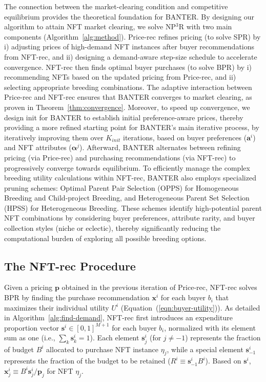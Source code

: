\documentclass[conference]{IEEEtran}
\theoremstyle{plain}
\begin{document}
    The connection between the market-clearing condition and competitive equilibrium provides the theoretical foundation for BANTER. By designing our algorithm to attain NFT market clearing, we solve NP$^3$R with two main components (Algorithm~\ref{alg:method}). Price-rec refines pricing (to solve SPR) by i) adjusting prices of high-demand NFT instances after buyer recommendations from NFT-rec, and ii) designing a demand-aware step-size schedule to accelerate convergence. NFT-rec then finds optimal buyer purchases (to solve BPR) by i) recommending NFTs based on the updated pricing from Price-rec, and ii) selecting appropriate breeding combinations. The adaptive interaction between Price-rec and NFT-rec ensures that BANTER converges to market clearing, as proven in Theorem~\ref{thm:convergence}. Moreover, to speed up convergence, we design init for BANTER to establish initial preference-aware prices, thereby providing a more refined starting point for BANTER's main iterative process, by iteratively improving them over $K_{init}$ iterations, based on buyer preferences ($\mathbf{a}^i$) and NFT attributes ($\bm{\alpha}^j$). Afterward, BANTER alternates between refining pricing (via Price-rec) and purchasing recommendations (via NFT-rec) to progressively converge towards equilibrium. To efficiently manage the complex breeding utility calculations within NFT-rec, BANTER also employs specialized pruning schemes: Optimal Parent Pair Selection (OPPS) for Homogeneous Breeding and Child-project Breeding, and Heterogeneous Parent Set Selection (HPSS) for Heterogeneous Breeding. These schemes identify high-potential parent NFT combinations by considering buyer preferences, attribute rarity, and buyer collection styles (niche or eclectic), thereby significantly reducing the computational burden of exploring all possible breeding options.

\subsection{The NFT-rec Procedure}
\label{subsec:method-user-demand}
    Given a pricing $\mathbf{p}$ obtained in the previous iteration of Price-rec, NFT-rec solves BPR by finding the purchase recommendation $\mathbf{x}^i$ for each buyer $b_i$ that maximizes their individual utility $U^i$ (Equation~(\ref{eqn:buyer-utility})). As detailed in Algorithm~\ref{alg:find-demand}, NFT-rec first introduces an expenditure proportion vector $\mathbf{s}^i\in [0,1]^{M+1}$ for each buyer $b_i$, normalized with its element sum as one (i.e., $\sum_k \mathbf{s}^i_k = 1$). Each element $\mathbf{s}^i_j$ (for $j \neq -1$) represents the fraction of budget $B^i$ allocated to purchase NFT instance $\eta_j$, while a special element $\mathbf{s}^i_{-1}$ represents the fraction of the budget to be retained ($R^i \equiv \mathbf{s}^i_{-1}B^i$). Based on $\mathbf{s}^i$,$\mathbf{x}^i_j \equiv B^i\mathbf{s}^i_j/\mathbf{p}_j$ for NFT $\eta_j$.
\end{document}
